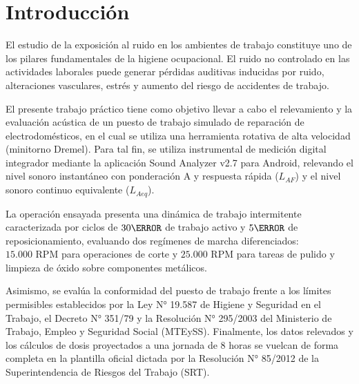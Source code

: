 \chapter{Introducción}
\label{sec:introduccion}

El estudio de la exposición al ruido en los ambientes de trabajo constituye uno de los pilares fundamentales
de la higiene ocupacional. El ruido no controlado en las actividades laborales puede generar pérdidas auditivas
inducidas por ruido, alteraciones vasculares, estrés y aumento del riesgo de accidentes de trabajo.

El presente trabajo práctico tiene como objetivo llevar a cabo el relevamiento y la evaluación acústica de un
puesto de trabajo simulado de reparación de electrodomésticos, en el cual se utiliza una herramienta rotativa de
alta velocidad (minitorno Dremel). Para tal fin, se utiliza instrumental de medición digital integrador mediante
la aplicación Sound Analyzer v2.7 para Android, relevando el nivel sonoro instantáneo con ponderación A y
respuesta rápida ($L_{AF}$) y el nivel sonoro continuo equivalente ($L_{Aeq}$).

La operación ensayada presenta una dinámica de trabajo intermitente caracterizada por ciclos de $30\s$ de trabajo
activo y $5\s$ de reposicionamiento, evaluando dos regímenes de marcha diferenciados: $15.000\text{ RPM}$ para
operaciones de corte y $25.000\text{ RPM}$ para tareas de pulido y limpieza de óxido sobre componentes metálicos.

Asimismo, se evalúa la conformidad del puesto de trabajo frente a los límites permisibles establecidos por la
Ley N° 19.587 de Higiene y Seguridad en el Trabajo, el Decreto N° 351/79 y la Resolución N° 295/2003 del
Ministerio de Trabajo, Empleo y Seguridad Social (MTEySS). Finalmente, los datos relevados y los cálculos
de dosis proyectados a una jornada de 8 horas se vuelcan de forma completa en la plantilla oficial dictada
por la Resolución N° 85/2012 de la Superintendencia de Riesgos del Trabajo (SRT).
